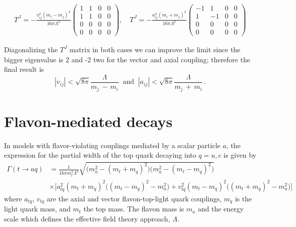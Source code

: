 \documentclass[prd,amsfonts,onecolumn,superscriptaddress,aps,nofootinbib,11pt]{revtex4-1}
\begin{document}
\begin{eqnarray}
T^J = -\frac{v_{ij}^2\left(m_i - m_j\right)^2}{16\pi\Lambda^2}
    \begin{pmatrix}
     1 & 1 & 0 & 0\\   
     1 & 1 & 0 & 0 \\
     0 & 0 & 0 & 0\\
     0 & 0 & 0 & 0
    \end{pmatrix}, \quad
T^J = -\frac{a_{ij}^2\left(m_i + m_j\right)^2}{16\pi\Lambda^2}
    \begin{pmatrix}
     -1 & 1 & 0 & 0\\   
     1 & -1 & 0 & 0 \\
     0 & 0 & 0 & 0\\
     0 & 0 & 0 & 0
    \end{pmatrix}
\end{eqnarray}

\indent Diagonalizing the $T^J$ matrix in both cases we can improve the limit since the bigger eigenvalue is 2 and -2 two for the vector and axial coupling; therefore the final result is
\begin{equation}
  \left|v_{ij} \right| < \sqrt{8\pi}\frac{\Lambda}{m_j\,-\,m_i} \;\;\mbox{and}\;\; \left|a_{ij} \right| <\sqrt{8\pi}\frac{\Lambda}{m_j\,+\,m_i}\, .
\end{equation}


\section{Flavon-mediated decays}
\label{app:decay}

In models with flavor-violating couplings mediated by a scalar particle $a$, the expression for the partial width of the top quark decaying into $q = u, c$ is given by %
\begin{equation}\label{eq:top-decay}
    \begin{split}
       \Gamma(t \to a q) &=  \frac{1}{16\pi m_t^3 \Lambda^2 } \sqrt{\Big(m_a^2 - (m_t + m_q)^2\Big) \Big(m_a^2 - (m_t - m_q)^2\Big)} \\
       &\times \Bigg[a_{tq}^2 (m_t+m_q)^2\Big((m_t - m_q)^2 - m_a^2 \Big)  + v_{tq}^2 (m_t - m_q)^2\Big((m_t + m_q)^2 - m_a^2\Big) \Bigg]
    \end{split}
\end{equation}
where $a_{tq}$, $v_{tq}$ are the axial and vector flavon-top-light quark couplings, $m_q$ is the light quark mass, and $m_t$ the top mass. The flavon mass is $m_a$ and the energy scale which defines the effective field theory approach, $\Lambda$.
\end{document}
